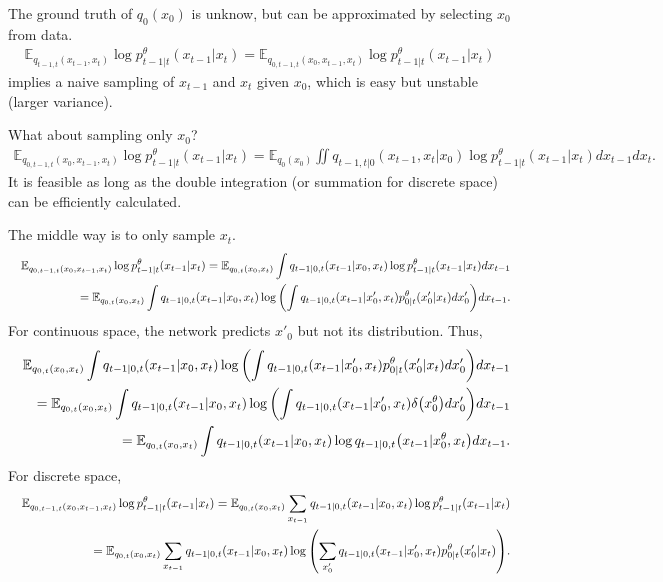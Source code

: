 \documentclass[10pt]{article}
\begin{document}
The ground truth of $q_0(x_0)$ is unknow, but can be approximated by selecting $x_0$ from data.
\begin{eqnarray*}
  \mathbb{E}_{q_{t-1,t}(x_{t-1},x_t)}\log p_{t-1|t}^\theta(x_{t-1}|x_t) = \mathbb{E}_{q_{0,t-1,t}(x_0,x_{t-1},x_t)}\log p_{t-1|t}^\theta(x_{t-1}|x_t)
\end{eqnarray*}
implies a naive sampling of $x_{t-1}$ and $x_t$ given $x_0$, which is easy but unstable (larger variance).

What about sampling only $x_0$?
\begin{eqnarray*}
  \mathbb{E}_{q_{0,t-1,t}(x_0,x_{t-1},x_t)}\log p_{t-1|t}^\theta(x_{t-1}|x_t) = \mathbb{E}_{q_0(x_0)}\iint q_{t-1,t|0}(x_{t-1},x_t|x_0)\log p_{t-1|t}^\theta(x_{t-1}|x_t) dx_{t-1}dx_t.
\end{eqnarray*}
It is feasible as long as the double integration (or summation for discrete space) can be efficiently calculated.

The middle way is to only sample $x_t$.
\begin{eqnarray*}
  &&\mathbb{E}_{q_{0,t-1,t}(x_0,x_{t-1},x_t)}\log p_{t-1|t}^\theta(x_{t-1}|x_t) = \mathbb{E}_{q_{0,t}(x_0,x_t)}\int q_{t-1|0,t}(x_{t-1}|x_0,x_t)\log p_{t-1|t}^\theta(x_{t-1}|x_t) dx_{t-1}\\
  &&= \mathbb{E}_{q_{0,t}(x_0,x_t)}\int q_{t-1|0,t}(x_{t-1}|x_0,x_t)\log \qty(\int q_{t-1|0,t}(x_{t-1}|x'_0,x_t) p_{0|t}^\theta(x'_0|x_t) dx'_0) dx_{t-1}.
\end{eqnarray*}
For continuous space, the network predicts $x'_0$ but not its distribution. Thus,
\begin{eqnarray*}
  &&\mathbb{E}_{q_{0,t}(x_0,x_t)}\int q_{t-1|0,t}(x_{t-1}|x_0,x_t)\log \qty(\int q_{t-1|0,t}(x_{t-1}|x'_0,x_t) p_{0|t}^\theta(x'_0|x_t) dx'_0) dx_{t-1}\\
  &&=\mathbb{E}_{q_{0,t}(x_0,x_t)}\int q_{t-1|0,t}(x_{t-1}|x_0,x_t)\log \qty(\int q_{t-1|0,t}(x_{t-1}|x'_0,x_t) \delta\qty(x_0^\theta) dx'_0) dx_{t-1}\\
  &&=\mathbb{E}_{q_{0,t}(x_0,x_t)}\int q_{t-1|0,t}(x_{t-1}|x_0,x_t)\log q_{t-1|0,t}\qty(x_{t-1}|x^\theta_0,x_t) dx_{t-1}.
\end{eqnarray*}
For discrete space,
\begin{eqnarray}\label{EqDisSpaTarget}
  &&\mathbb{E}_{q_{0,t-1,t}(x_0,x_{t-1},x_t)}\log p_{t-1|t}^\theta(x_{t-1}|x_t) = \mathbb{E}_{q_{0,t}(x_0,x_t)}\sum_{x_{t-1}} q_{t-1|0,t}(x_{t-1}|x_0,x_t)\log p_{t-1|t}^\theta(x_{t-1}|x_t)\nonumber\\
  &&= \mathbb{E}_{q_{0,t}(x_0,x_t)}\sum_{x_{t-1}} q_{t-1|0,t}(x_{t-1}|x_0,x_t)\log \qty(\sum_{x'_0} q_{t-1|0,t}(x_{t-1}|x'_0,x_t) p_{0|t}^\theta(x'_0|x_t)).
\end{eqnarray}
\end{document}
